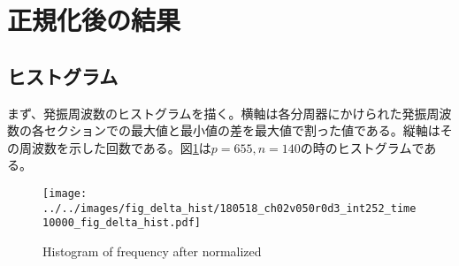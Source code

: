 \documentclass{jsarticle}
\begin{document}

\section{正規化後の結果}
\subsection{ヒストグラム}
まず、発振周波数のヒストグラムを描く。横軸は各分周器にかけられた発振周波数の各セクションでの最大値と最小値の差を最大値で割った値である。縦軸はその周波数を示した回数である。図\ref{fig:fig_delta_hist/180518_ch02v050r0d3_int252_time10000_fig_delta_hist.pdf}は$p=655, n=140$の時のヒストグラムである。

\begin{figure}[H]
	\centering
	\texttt{[image: ../../images/fig\_delta\_hist/180518\_ch02v050r0d3\_int252\_time10000\_fig\_delta\_hist.pdf]}
	\label{fig:fig_delta_hist/180518_ch02v050r0d3_int252_time10000_fig_delta_hist.pdf}
	\caption{Histogram of frequency after normalized}
\end{figure}

\end{document}
